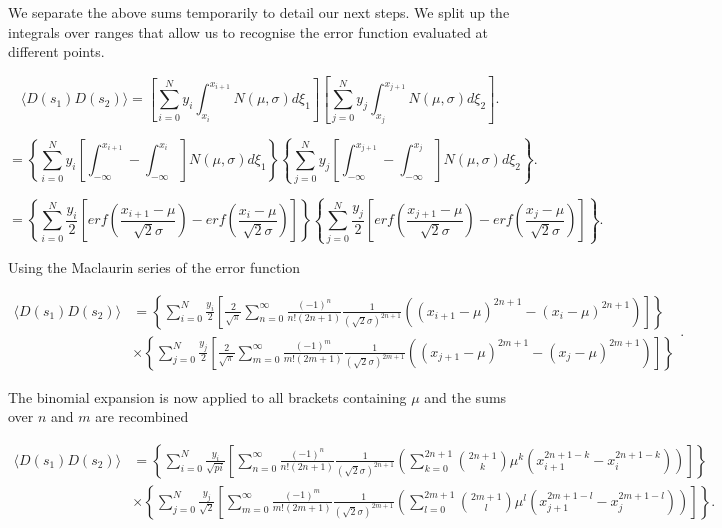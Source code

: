 \documentclass[apj]{emulateapj}
\begin{document}
We separate the above sums temporarily to detail our next steps. We split up the integrals over ranges that allow us to recognise the error function evaluated at different points.

\begin{equation}
\langle D(s_1) D(s_2) \rangle = \left[ \sum_{i=0}^N  y_i \int_{x_i}^{x_{i+1}} N(\mu, \sigma)  d\xi_1 \right] \left[  \sum_{j=0}^N y_j \int_{x_j}^{x_{j+1}} N(\mu, \sigma)d\xi_2 \right].
\end{equation}

\begin{equation}
= \left\{ \sum_{i=0}^N  y_i \left[ \int_{-\infty}^{x_{i+1}} - \int_{-\infty}^{x_{i}} \right] N(\mu, \sigma)  d\xi_1 \right\} \left\{  \sum_{j=0}^N y_j \left[ \int_{-\infty}^{x_{j+1}} - \int_{-\infty}^{x_{j}} \right] N(\mu, \sigma)d\xi_2 \right\}.
\end{equation}

\begin{equation}
= \left\{ \sum_{i=0}^N  \frac{y_i}{2} \left[ erf \left( \frac{x_{i+1} - \mu}{\sqrt{2}\sigma} \right) - erf \left( \frac{x_{i} - \mu}{\sqrt{2}\sigma} \right) \right] \right\} \left\{  \sum_{j=0}^N \frac{y_j}{2} \left[ erf \left( \frac{x_{j+1} - \mu}{\sqrt{2}\sigma} \right) - erf \left( \frac{x_{j} - \mu}{\sqrt{2}\sigma} \right) \right] \right\}.
\end{equation}

Using the Maclaurin series of the error function

\begin{equation}
\begin{aligned}
\langle D(s_1) D(s_2) \rangle &= \left\{ \sum_{i=0}^N  \frac{y_i}{2} \left[ \frac{2}{\sqrt{\pi}} \sum_{n = 0}^\infty \frac{(-1)^n}{n! (2n+1)} \frac{1}{(\sqrt{2}\sigma)^{2n+1}} \left( (x_{i+1}-\mu)^{2n+1} - (x_{i}-\mu)^{2n+1} \right) \right] \right\} \\
&\times \left\{ \sum_{j=0}^N  \frac{y_j}{2} \left[ \frac{2}{\sqrt{\pi}} \sum_{m = 0}^\infty \frac{(-1)^m}{m! (2m+1)} \frac{1}{(\sqrt{2}\sigma)^{2m+1}} \left( (x_{j+1}-\mu)^{2m+1} - (x_{j}-\mu)^{2m+1} \right) \right] \right\}
\end{aligned}.
\end{equation}

The binomial expansion is now applied to all brackets containing $\mu$ and the sums over $n$ and $m$ are recombined

\begin{equation}
\begin{aligned}
\langle D(s_1) D(s_2) \rangle &= \left\{ \sum_{i=0}^N  \frac{y_i}{\sqrt{pi}} \left[ \sum_{n = 0}^\infty \frac{(-1)^n}{n! (2n+1)} \frac{1}{(\sqrt{2}\sigma)^{2n+1}} \left( \sum_{k=0}^{2n+1} {2n+1 \choose k} \mu^k ( x_{i+1}^{2n+1-k} - x_{i}^{2n+1-k} ) \right) \right] \right\} \\
&\times \left\{ \sum_{j=0}^N  \frac{y_j}{\sqrt{2}} \left[ \sum_{m = 0}^\infty \frac{(-1)^m}{m! (2m+1)} \frac{1}{(\sqrt{2}\sigma)^{2m+1}} \left( \sum_{l=0}^{2m+1} {2m+1 \choose l} \mu^l ( x_{j+1}^{2m+1-l} - x_{j}^{2m+1-l} ) \right) \right] \right\}.
\end{aligned}
\end{equation}
\end{document}
